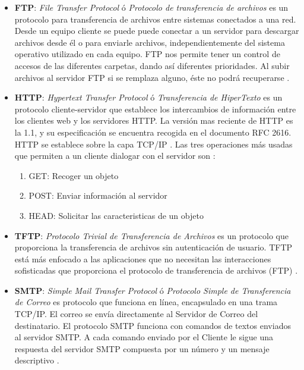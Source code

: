 \documentclass[12pt, a4paper, titlepage]{report}
\begin{document}
            \begin{itemize}
                \item \textbf{FTP}: \textit{File Transfer Protocol} ó \textit{Protocolo de transferencia de archivos} es un protocolo para transferencia de archivos entre sistemas conectados a una red. Desde un equipo cliente se puede puede conectar a un servidor para descargar archivos desde él o para enviarle archivos, independientemente del sistema operativo utilizado en cada equipo. FTP nos permite tener un control de accesos de las diferentes carpetas, dando así diferentes prioridades. Al subir archivos al servidor FTP si se remplaza alguno, éste no podrá recuperarse \cite{FTPprotocoloOSI}.
                \item \textbf{HTTP}: \textit{Hypertext Transfer Protocol} ó \textit{Transferencia de HiperTexto} es un protocolo cliente-servidor que establece los intercambios de información entre los clientes web y los servidores HTTP. La versión mas reciente de HTTP es la 1.1, y su especificación se encuentra recogida en el documento RFC 2616. HTTP se establece sobre la capa TCP/IP \cite{HTTPprotocloOSI}. Las tres operaciones más usadas que permiten a un cliente dialogar con el servidor son \cite{FTPprotocoloOSI}:
                \begin{enumerate}
                    \item GET: Recoger un objeto
                    \item POST: Enviar información al servidor
                    \item HEAD: Solicitar las caracteristicas de un objeto 
                \end{enumerate}
                \item \textbf{TFTP}: \textit{Protocolo Trivial de Transferencia de Archivos} es un protocolo que proporciona la transferencia de archivos sin autenticación de usuario. TFTP está más enfocado a las aplicaciones que no necesitan las interacciones sofisticadas que proporciona el protocolo de transferencia de archivos (FTP) \cite{TFTPprotocoloOSI}.
                \item \textbf{SMTP}: \textit{Simple Mail Transfer Protocol} ó \textit{Protocolo Simple de Transferencia de Correo} es protocolo que funciona en línea, encapsulado en una trama TCP/IP. El correo se envía directamente al Servidor de Correo del destinatario. El protocolo SMTP funciona con comandos de textos enviados al servidor SMTP. A cada comando enviado por el Cliente le sigue una respuesta del servidor SMTP compuesta por un número y un mensaje descriptivo \cite{SMTPprotocoloOSI}. 

\end{itemize}
\end{document}
